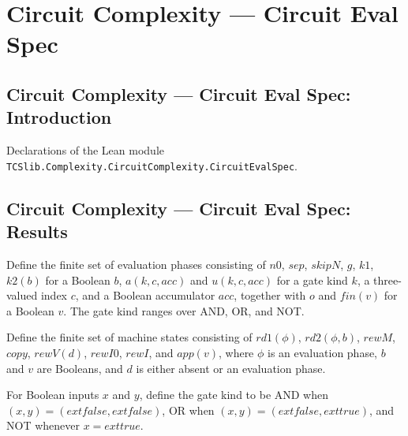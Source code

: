 \section{Circuit Complexity --- Circuit Eval Spec}
\subsection*{Circuit Complexity --- Circuit Eval Spec: Introduction}

Declarations of the Lean module \texttt{TCSlib.Complexity.CircuitComplexity.CircuitEvalSpec}.

\subsection*{Circuit Complexity --- Circuit Eval Spec: Results}

\begin{definition}
\label{BoolCircuit.CircuitEval.Ph}
\leanok
{}
Define the finite set of evaluation phases consisting of $n0$, $sep$, $skipN$, $g$,
$k1$, $k2(b)$ for a Boolean $b$, $a(k,c,acc)$ and $u(k,c,acc)$ for a gate kind $k$, a
three-valued index $c$, and a Boolean accumulator $acc$, together with $o$ and $fin(v)$
for a Boolean $v$. The gate kind ranges over AND, OR, and NOT.
\end{definition}

\begin{definition}
\label{BoolCircuit.CircuitEval.St}
\leanok
{}
Define the finite set of machine states consisting of $rd1(\phi)$, $rd2(\phi,b)$,
$rewM$, $copy$, $rewV(d)$, $rewI0$, $rewI$, and $app(v)$, where $\phi$ is an evaluation
phase, $b$ and $v$ are Booleans, and $d$ is either absent or an evaluation phase.
\end{definition}

\begin{definition}
\label{BoolCircuit.CircuitEval.kindOf}
\leanok
{}
For Boolean inputs $x$ and $y$, define the gate kind to be AND when
$(x,y)=(	ext{false},	ext{false})$, OR when $(x,y)=(	ext{false},	ext{true})$, and NOT
whenever $x=	ext{true}$.
\end{definition}

